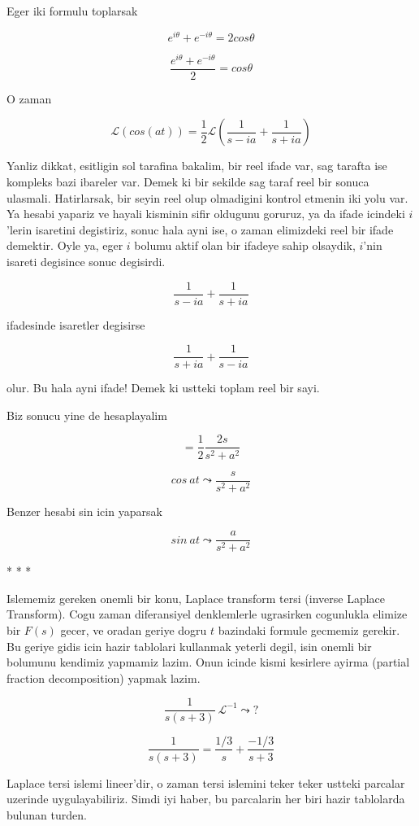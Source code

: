 \documentclass[12pt,fleqn]{article}
\begin{document}
Eger iki formulu toplarsak

\[ e^{i\theta} + e^{-i\theta} = 2 cos\theta \]

\[ \frac{e^{i\theta} + e^{-i\theta}}{2} = cos\theta \]

O zaman 

\[ \mathcal{L}(cos(at)) = \frac{1}{2} \mathcal{L} 
(\frac{1}{s-ia} + \frac{1}{s+ia} )
\]

Yanliz dikkat, esitligin sol tarafina bakalim, bir reel ifade var, sag
tarafta ise kompleks bazi ibareler var. Demek ki bir sekilde sag taraf reel
bir sonuca ulasmali. Hatirlarsak, bir seyin reel olup olmadigini kontrol
etmenin iki yolu var. Ya hesabi yapariz ve hayali kisminin sifir oldugunu
goruruz, ya da ifade icindeki $i$'lerin isaretini degistiriz, sonuc hala
ayni ise, o zaman elimizdeki reel bir ifade demektir. Oyle ya, eger $i$
bolumu aktif olan bir ifadeye sahip olsaydik, $i$'nin isareti degisince
sonuc degisirdi. 

\[ \frac{1}{s-ia} + \frac{1}{s+ia} \]

ifadesinde isaretler degisirse 

\[ \frac{1}{s+ia} + \frac{1}{s-ia} \]

olur. Bu hala ayni ifade! Demek ki ustteki toplam reel bir sayi. 

Biz sonucu yine de hesaplayalim

\[ = \frac{1}{2}\frac{2s}{s^2+a^2} \]

\[ cos \ at \leadsto \frac{s}{s^2+a^2} \]

Benzer hesabi sin icin yaparsak 

\[ sin \ at \leadsto \frac{a}{s^2 + a^2} \]


* * * 

Islememiz gereken onemli bir konu, Laplace transform tersi (inverse Laplace
Transform). Cogu zaman diferansiyel denklemlerle ugrasirken cogunlukla
elimize bir $F(s)$ gecer, ve oradan geriye dogru $t$ bazindaki formule
gecmemiz gerekir. Bu geriye gidis icin hazir tablolari kullanmak yeterli
degil, isin onemli bir bolumunu kendimiz yapmamiz lazim. Onun icinde kismi
kesirlere ayirma (partial fraction decomposition) yapmak lazim.  

\[ \frac{1}{s(s+3)} \ \mathcal{L}^{-1} \leadsto ? \]


\[ \frac{1}{s(s+3)} = 
\frac{1/3}{s} + \frac{-1/3}{s+3}
\]

Laplace tersi islemi lineer'dir, o zaman tersi islemini teker teker ustteki
parcalar uzerinde uygulayabiliriz. Simdi iyi haber, bu parcalarin her biri
hazir tablolarda bulunan turden. 
\end{document}
